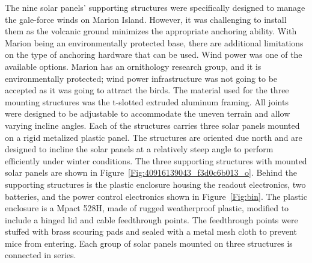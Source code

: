 The nine solar panels' supporting structures were specifically designed to manage the gale-force winds on Marion Island. However, it was challenging to install them as the volcanic ground minimizes the appropriate anchoring ability. With Marion being an environmentally protected base, there are additional limitations on the type of anchoring hardware that can be used. Wind power was one of the available options. Marion has an ornithology research group, and it is environmentally protected; wind power infrastructure was not going to be accepted as it was going to attract the birds. The material used for the three mounting structures was the t-slotted extruded aluminum framing. All joints were designed to be adjustable to accommodate the uneven terrain and allow varying incline angles. Each of the structures carries three solar panels mounted on a rigid metalized plastic panel. The structures are oriented due north and are designed to incline the solar panels at a relatively steep angle to perform efficiently under winter conditions. The three supporting structures with mounted solar panels are shown in Figure~\ref{Fig:40916139043_f3d0c6b013_o}. Behind the supporting structures is the plastic enclosure housing the readout electronics, two batteries, and the power control electronics shown in Figure~\ref{Fig:bin}. The plastic enclosure is a Mpact 528H, made of rugged weatherproof plastic, modified to include a hinged lid and cable feedthrough points.  The feedthrough points were stuffed with brass scouring pads and sealed with a metal mesh cloth to prevent mice from entering. Each group of solar panels mounted on three structures is connected in series.
